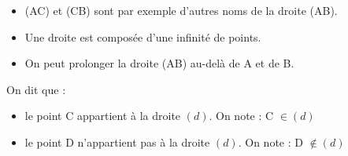 \begin{minipage}[c]{0.8\textwidth}
\begin{Remarque}
\leavevmode\vspace{-\baselineskip}
\begin{itemize}[label=\textcolor{Couleur7}{$\bullet$}]
\item (AC) et (CB) sont par exemple d'autres noms de la droite (AB).
\item Une droite est composée d'une infinité de points.
\item On peut prolonger la droite (AB) au-delà de A et de B.
\end{itemize}
\end{Remarque}

\begin{Notation}
On dit que :
\begin{itemize}
\item le point C appartient à la droite $(d)$. On note : C $\in (d)$
\item le point D n'appartient pas à la droite $(d)$. On note : D $\notin (d)$

\end{itemize}
\end{Notation}

\end{minipage}
\hfill
\begin{minipage}[c]{0.15\textwidth}
\begin{center}
\end{center}
\end{minipage}

